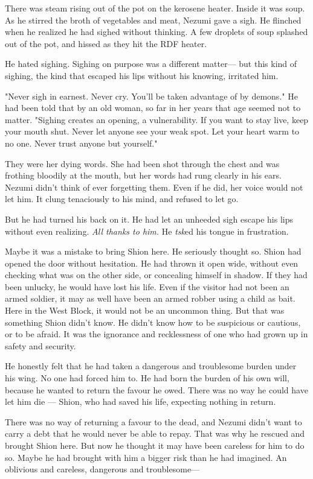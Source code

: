 \myspace

There was steam rising out of the pot on the kerosene heater. Inside it
was soup. As he stirred the broth of vegetables and meat, Nezumi gave a
sigh. He flinched when he realized he had sighed without thinking. A few
droplets of soup splashed out of the pot, and hissed as they hit the RDF
heater.

He hated sighing. Sighing on purpose was a different matter--- but this
kind of sighing, the kind that escaped his lips without his knowing,
irritated him.

"Never sigh in earnest. Never cry. You'll be taken advantage of by
demons." He had been told that by an old woman, so far in her years that
age seemed not to matter. "Sighing creates an opening, a vulnerability.
If you want to stay live, keep your mouth shut. Never let anyone see
your weak spot. Let your heart warm to no one. Never trust anyone but
yourself."

They were her dying words. She had been shot through the chest and was
frothing bloodily at the mouth, but her words had rung clearly in his
ears. Nezumi didn't think of ever forgetting them. Even if he did, her
voice would not let him. It clung tenaciously to his mind, and refused
to let go.

But he had turned his back on it. He had let an unheeded sigh escape his
lips without even realizing. \emph{All thanks to him.} He \emph{tsk}ed his tongue in
frustration.

Maybe it was a mistake to bring Shion here. He seriously thought so.
Shion had opened the door without hesitation. He had thrown it open
wide, without even checking what was on the other side, or concealing
himself in shadow. If they had been unlucky, he would have lost his
life. Even if the visitor had not been an armed soldier, it may as well
have been an armed robber using a child as bait. Here in the West Block,
it would not be an uncommon thing. But that was something Shion didn't
know. He didn't know how to be suspicious or cautious, or to be afraid.
It was the ignorance and recklessness of one who had grown up in safety
and security.

He honestly felt that he had taken a dangerous and troublesome burden
under his wing. No one had forced him to. He had born the burden of his
own will, because he wanted to return the favour he owed. There was no
way he could have let him die --- Shion, who had saved his life, expecting
nothing in return.

There was no way of returning a favour to the dead, and Nezumi didn't
want to carry a debt that he would never be able to repay. That was why
he rescued and brought Shion here. But now he thought it may have been
careless for him to do so. Maybe he had brought with him a bigger risk
than he had imagined. An oblivious and careless, dangerous and
troublesome---

